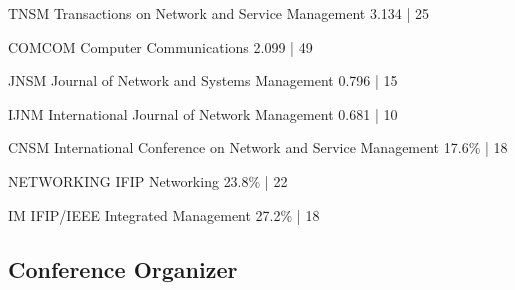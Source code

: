 \documentclass[print]{styles/friggeri-cv-mac} %
\begin{document}
\begin{entrylist}
\vspace{-0.3cm}
\entry
{TNSM} %
{Transactions on Network and Service Management}
{3.134 | 25}
	
\vspace{-0.3cm}
\entry
{COMCOM} %
{Computer Communications}
{2.099 | 49}

\vspace{-0.3cm}
\entry
{JNSM} %
{Journal of Network and Systems Management}
{0.796 | 15}

\vspace{-0.3cm}
\entry
{IJNM} %
{International Journal of Network Management}
{0.681 | 10}

\vspace{-0.3cm}
\entry
{CNSM} %
{International Conference on Network and Service Management}
{17.6\% | 18}

\vspace{-0.3cm}
\entry
{NETWORKING} %
{IFIP Networking}
{23.8\% | 22 }

\vspace{-0.3cm}
\entry
{IM} %
{IFIP/IEEE Integrated Management}
{27.2\% | 18}


\end{entrylist}



\subsection{Conference Organizer}\vspace{-5pt}
\end{document}
